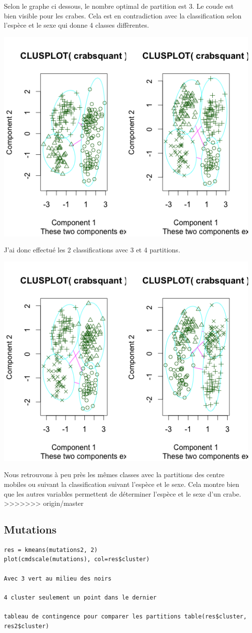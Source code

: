 \documentclass{article}\usepackage[]{graphicx}\usepackage[]{color}
\begin{document}
Selon le graphe ci dessous, le nombre optimal de partition est 3. Le coude est bien visible pour les crabes. Cela est en contradiction avec la classification selon l'espèce et le sexe qui donne 4 classes diffèrentes.  


\includegraphics[width=\textwidth]{ex2_crab_3.png}

J'ai donc effectué les 2 classifications avec 3 et 4 partitions. 

\includegraphics[width=\textwidth]{ex2_crab_4.png}

Nous retrouvons à peu près les mêmes classes avec la partitions des centre mobiles ou suivant la classification suivant l'espèce et le sexe. Cela montre bien que les autres variables permettent de déterminer l'espèce et le sexe d'un crabe. 
>>>>>>> origin/master

\subsection*{Mutations}
\begin{verbatim}
res = kmeans(mutations2, 2)
plot(cmdscale(mutations), col=res$cluster)

Avec 3 vert au milieu des noirs 

4 cluster seulement un point dans le dernier

tableau de contingence pour comparer les partitions table(res$cluster, res2$cluster)
\end{verbatim}
\end{document}
